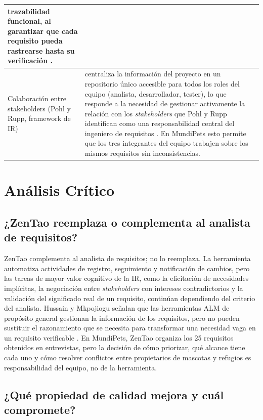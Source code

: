 \documentclass[journal,onecolumn]{IEEEtran}
\begin{document}
\begin{table}[H]
\begin{tabularx}{\textwidth}{|l|X|}
		\textbf{trazabilidad funcional}, al garantizar que cada requisito pueda
		rastrearse hasta su verificación \cite{iso25010}. \\
		\hline
		Colaboración entre stakeholders (Pohl y Rupp, framework de IR)
		& centraliza la información del proyecto en un repositorio único accesible
		para todos los roles del equipo (analista, desarrollador, tester), lo que
		responde a la necesidad de gestionar activamente la relación con los
		\textit{stakeholders} que Pohl y Rupp identifican como una responsabilidad
		central del ingeniero de requisitos \cite{pohl2015}. En MundiPets esto
		permite que los tres integrantes del equipo trabajen sobre los mismos
		requisitos sin inconsistencias. \\
		\hline
	\end{tabularx}
\end{table}

\newpage

\section{Análisis Crítico}

\subsection{¿ZenTao reemplaza o complementa al analista de requisitos?}

ZenTao complementa al analista de requisitos; no lo reemplaza. La herramienta automatiza
actividades de registro, seguimiento y notificación de cambios, pero las tareas de mayor
valor cognitivo de la IR, como la elicitación de necesidades implícitas, la negociación entre
\textit{stakeholders} con intereses contradictorios y la validación del significado real de un
requisito, continúan dependiendo del criterio del analista. Hussain y Mkpojiogu señalan que
las herramientas ALM de propósito general gestionan la información de los requisitos, pero no
pueden sustituir el razonamiento que se necesita para transformar una necesidad vaga en un
requisito verificable \cite{hussain2022}. En MundiPets, ZenTao organiza los 25 requisitos
obtenidos en entrevistas, pero la decisión de cómo priorizar, qué alcance tiene cada uno y
cómo resolver conflictos entre propietarios de mascotas y refugios es responsabilidad del equipo,
no de la herramienta.

\subsection{¿Qué propiedad de calidad mejora y cuál compromete?}
\end{document}
